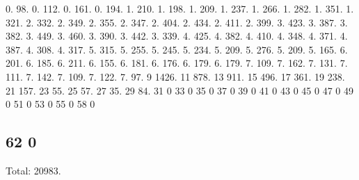 0. 98. 0. 112. 0. 161. 0. 194. 1. 210. 1. 198. 1. 209. 1. 237. 1. 266. 1. 282. 1. 351. 1. 321. 2. 332. 2. 349. 2. 355. 2. 347. 2. 404. 2. 434. 2. 411. 2. 399. 3. 423. 3. 387. 3. 382. 3. 449. 3. 460. 3. 390. 3. 442. 3. 339. 4. 425. 4. 382. 4. 410. 4. 348. 4. 371. 4. 387. 4. 308. 4. 317. 5. 315. 5. 255. 5. 245. 5. 234. 5. 209. 5. 276. 5. 209. 5. 165. 6. 201. 6. 185. 6. 211. 6. 155. 6. 181. 6. 176. 6. 179. 6. 179. 7. 109. 7. 162. 7. 131. 7. 111. 7. 142. 7. 109. 7. 122. 7. 97. 9 1426. 11 878. 13 911. 15 496. 17 361. 19 238. 21 157. 23 55. 25 57. 27 35. 29 84. 31 0 33 0 35 0 37 0 39 0 41 0 43 0 45 0 47 0 49 0 51 0 53 0 55 0 58 0 \subsection*{62 0 }

Total\+: 20983. 